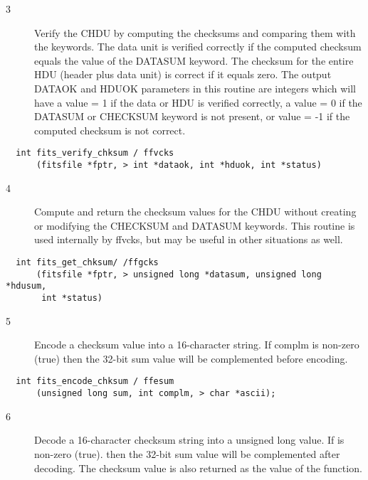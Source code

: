 \documentclass[11pt]{book}
\begin{document}
\begin{description}
\item[3 ] Verify the CHDU by computing the checksums and comparing
    them with the keywords.  The data unit is verified correctly
    if the computed checksum equals the value of the DATASUM
    keyword.  The checksum for the entire HDU (header plus data unit) is
    correct if it equals zero.  The output DATAOK and HDUOK parameters
    in this routine are integers which will have a value = 1
    if the data or HDU is verified correctly, a value = 0
    if the DATASUM or CHECKSUM keyword is not present, or value = -1
   if the computed checksum is not correct. \label{ffvcks}
\end{description}

\begin{verbatim}
  int fits_verify_chksum / ffvcks
      (fitsfile *fptr, > int *dataok, int *hduok, int *status)
\end{verbatim}

\begin{description}
\item[4 ] Compute and return the checksum values for the CHDU
    without creating or modifying the
    CHECKSUM and DATASUM keywords.  This routine is used internally by
   ffvcks, but may be useful in other situations as well. \label{ffgcks}
\end{description}

\begin{verbatim}
  int fits_get_chksum/ /ffgcks
      (fitsfile *fptr, > unsigned long *datasum, unsigned long *hdusum,
       int *status)
\end{verbatim}

\begin{description}
\item[5 ] Encode a checksum value
    into a 16-character string.  If complm is non-zero (true) then the 32-bit
   sum value will be complemented before encoding. \label{ffesum}
\end{description}

\begin{verbatim}
  int fits_encode_chksum / ffesum
      (unsigned long sum, int complm, > char *ascii);
\end{verbatim}

\begin{description}
\item[6 ] Decode a 16-character checksum string into a unsigned long value.
    If is non-zero (true). then the 32-bit sum value will be complemented
    after decoding.  The checksum value is also returned as the
   value of the function. \label{ffdsum}
\end{description}
\end{document}
